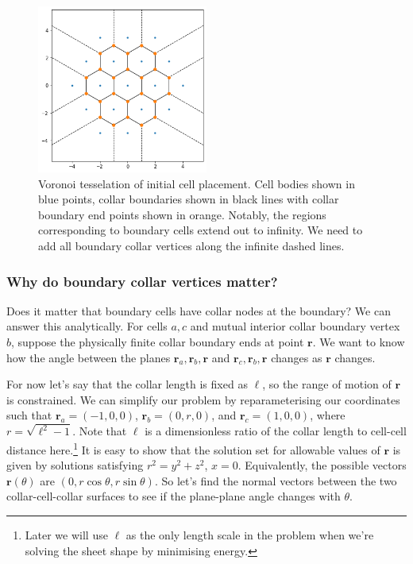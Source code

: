 \documentclass[draft]{article}
\begin{document}
\begin{figure}[htbp]
    \centering
    \includegraphics[width=0.5\textwidth]{figures/numerical/voronoi.png}
    \caption{Voronoi tesselation of initial cell placement. Cell bodies shown in blue points, collar boundaries shown in black lines with collar boundary end points shown in orange. Notably, the regions corresponding to boundary cells extend out to infinity. We need to add all boundary collar vertices along the infinite dashed lines.}
    \label{fig:voronoi}
\end{figure}

\subsubsection{Why do boundary collar vertices matter?}

Does it matter that boundary cells have collar nodes at the boundary? We can answer this analytically. For cells $a, c$ and mutual interior collar boundary vertex $b$, suppose the physically finite collar boundary ends at point $\bm{r}$. We want to know how the angle between the planes $\bm{r}_a, \bm{r}_b, \bm{r}$ and $\bm{r}_c, \bm{r}_b, \bm{r}$ changes as $\bm{r}$ changes. 

For now let's say that the collar length is fixed as $\ell$, so the range of motion of $\bm{r}$ is constrained. We can simplify our problem by reparameterising our coordinates such that $\bm{r}_a = (-1, 0, 0)$, $\bm{r}_b = (0, r, 0)$, and $\bm{r}_c = (1, 0, 0)$, where $r = \sqrt{\ell^2 - 1}$. Note that $\ell$ is a dimensionless ratio of the collar length to cell-cell distance here.\footnote{Later we will use $\ell$ as the only length scale in the problem when we're solving the sheet shape by minimising energy.} It is easy to show that the solution set for allowable values of $\bm{r}$ is given by solutions satisfying $r^2 = y^2 + z^2$, $x=0$. Equivalently, the possible vectors $\bm{r}(\theta)$ are $(0, r\cos\theta, r\sin\theta)$. So let's find the normal vectors between the two collar-cell-collar surfaces to see if the plane-plane angle changes with $\theta$. 
\end{document}
